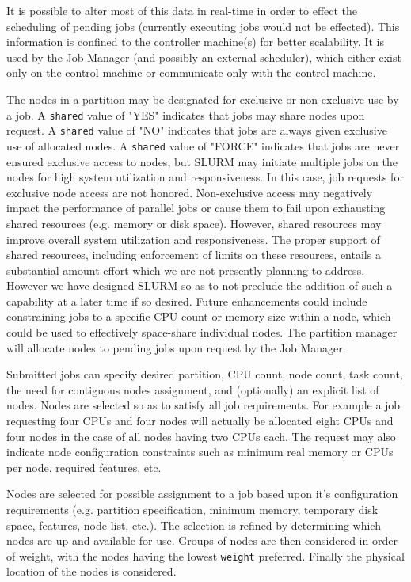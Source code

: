 It is possible to alter most of this data in real-time in order
to effect the scheduling of pending jobs (currently executing jobs
would not be effected).  This information is confined to the controller
machine(s) for better scalability.  It is used by the Job Manager
(and possibly an external scheduler), which either exist only on the
control machine or communicate only with the control machine. 

The nodes in a partition may be designated for exclusive or non-exclusive
use by a job.  A {\tt shared} value of "YES" indicates that jobs may share nodes
upon request.  A {\tt shared} value of "NO" indicates that jobs are always given
exclusive use of allocated nodes.  A {\tt shared} value of "FORCE" indicates
that jobs are never ensured exclusive access to nodes, but SLURM
may initiate multiple jobs on the nodes for high system utilization
and responsiveness.  In this case, job requests for exclusive node
access are not honored.  Non-exclusive access may negatively impact
the performance of parallel jobs or cause them to fail upon exhausting
shared resources (e.g. memory or disk space). However, shared resources
may improve overall system utilization and responsiveness. The
proper support of shared resources, including enforcement of limits on
these resources, entails a substantial amount effort which we are not
presently planning to address.  However we have designed SLURM so as
to not preclude the addition of such a capability at a later time if
so desired.  Future enhancements could include constraining jobs to a
specific CPU count or memory size within a node, which could be used
to effectively space-share individual nodes.  The partition manager will 
allocate nodes to pending jobs upon request by the Job Manager.

Submitted jobs can specify desired partition, CPU count, node count,
task count,  the need for contiguous nodes assignment, and (optionally)
an explicit list of nodes.  Nodes are selected so as to satisfy all
job requirements.  For example a job requesting four CPUs and four nodes
will actually be allocated eight CPUs and four nodes in the case of all
nodes having two CPUs each.  
The request may also indicate node configuration constraints such as
minimum real memory or CPUs per node, required features, etc.

Nodes are selected for possible assignment to a job based upon it's
configuration requirements (e.g. partition specification, minimum memory,
temporary disk space, features, node list, etc.).  The selection is
refined by determining which nodes are up and available for use.
Groups of nodes are then considered in order of weight, with the
nodes having the lowest {\tt weight} preferred.
Finally the physical location of the nodes is considered.

